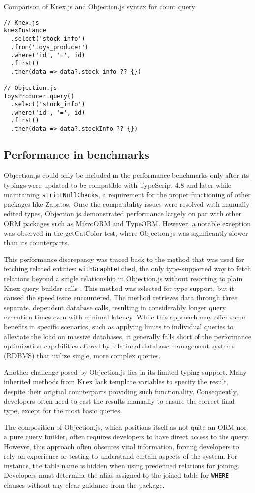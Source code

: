 \begin{listing}
\caption{Comparison of Knex.js and Objection.js syntax for count query}
\label{lst:knexObjection}
\begin{verbatim}
// Knex.js
knexInstance
  .select('stock_info')
  .from('toys_producer')
  .where('id', '=', id)
  .first()
  .then(data => data?.stock_info ?? {})

// Objection.js
ToysProducer.query()
  .select('stock_info')
  .where('id', '=', id)
  .first()
  .then(data => data?.stockInfo ?? {})
\end{verbatim}
\end{listing}

\subsection*{Performance in benchmarks}

Objection.js could only be included in the performance benchmarks only after its
typings were updated to be compatible with TypeScript 4.8 and later while
maintaining \texttt{strictNullChecks}, a requirement for the proper functioning
of other packages like Zapatos. Once the compatibility issues were resolved with
manually edited types, Objection.js demonstrated performance largely on par with
other ORM packages such as MikroORM and TypeORM. However, a notable exception
was observed in the getCatColor test, where Objection.js was significantly
slower than its counterparts.

This performance discrepancy was traced back to the method that was used for
fetching related entities: \texttt{withGraphFetched}, the only type-supported
way to fetch relations beyond a single relationship in Objection.js without
resorting to plain Knex query builder calls \cite{objectionDocs}. This method
was selected for type support, but it caused the speed issue encountered. The
method retrieves data through three separate, dependent database calls,
resulting in considerably longer query execution times even with minimal
latency. While this approach may offer some benefits in specific scenarios, such
as applying limits to individual queries to alleviate the load on massive
databases, it generally falls short of the performance optimization capabilities
offered by relational database management systems (RDBMS) that utilize single,
more complex queries.

Another challenge posed by Objection.js lies in its limited typing support. Many
inherited methods from Knex lack template variables to specify the result,
despite their original counterparts providing such functionality. Consequently,
developers often need to cast the results manually to ensure the correct final
type, except for the most basic queries.

The composition of Objection.js, which positions itself as not quite an ORM nor
a pure query builder, often requires developers to have direct access to the
query. However, this approach often obscures vital information, forcing
developers to rely on experience or testing to understand certain aspects of the
system. For instance, the table name is hidden when using predefined relations
for joining. Developers must determine the alias assigned to the joined table
for \texttt{WHERE} clauses without any clear guidance from the package.